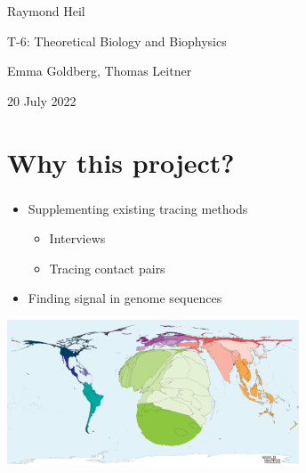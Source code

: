 \documentclass[aspectratio=169]{beamer}
\begin{document}
\begin{frame}

    \begin{center}

        \vfill

        Raymond Heil

        T-6: Theoretical Biology and Biophysics

        Emma Goldberg, Thomas Leitner

        \vfill

        \scriptsize{20 July 2022}

    \end{center}


\end{frame}

\section{Why this project?}

\begin{frame} \frametitle{\insertsection}

    \leavevmode\hphantom{ } %

    \begin{itemize}
        \item Supplementing existing tracing methods
        \begin{itemize}
            \item Interviews
            \item Tracing contact pairs
        \end{itemize}
        \item Finding signal in genome sequences 
    \end{itemize}

    \leavevmode\hphantom{ } %

    \centering\includegraphics[width=0.65\textwidth]{images/hiv-cartogram}


\end{frame}
\end{document}
